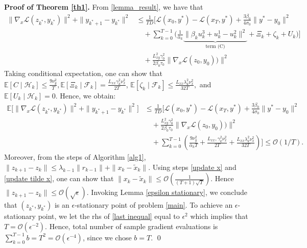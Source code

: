 \documentclass[letterpaper,11 pt]{article}
\def\ml{\mathcal L}
\begin{document}
{\bf Proof of Theorem \ref{th1}.} From \eqref{lemma_result}, we have that
\begin{align}
  \nonumber\|\nabla_x \ml(z_{k^*},y_{k^*})\|^2+\|y_{k^*+1}-y_{k^*}\|^2&\leq \nonumber \tfrac{1}{TD}\biggr[ \ml(x_0,y^*)-\ml(x_T,y^*) +\tfrac{3\beta_0}{4\sigma_0}\|y^*-y_0\|^2\\\nonumber&\quad + \sum_{k=0}^{T-1}\biggr(\tfrac{1}{\bar \alpha_k} \underbrace{\|\beta_k u_k^3+u_k^1-u_k^2\|^2}_{\text{term (C)}}+\Xi_k+\zeta_k+U_k\biggr)\biggr]  \nonumber \\
  &\quad + \tfrac{{L^2_{xy}}\gamma_0^2}{2\beta_0\tau_0}\|\nabla_x \ml(z_0,y_0))\|^2
\end{align}
{ Taking conditional expectation, one can show that $\mathbb E[C \mid \mathcal H_k ]\leq \tfrac{9\nu^2_y}{T}, \mathbb E[\Xi_k \mid \mathcal F_k]=\tfrac{L_{xx} \gamma^2_k \nu^2_x}{2T}$, $\mathbb E[\zeta_k \mid \mathcal F_k]\leq \tfrac{L_{xx} \lambda^2_k \nu^2_x}{32T},$ and $\mathbb E[U_k \mid \mathcal H_k ]=0$. Hence, we obtain:
\begin{align}\label{last inequal}
    \nonumber\mathbb E \biggr[ \|\nabla_x \ml(z_{k^*},y_{k^*})\|^2+\|y_{k^*+1}-y_{k^*}
    \|^2\biggr]&\leq 
  \tfrac{1}{TD} \biggr[ \ml(x_0,y^*)-\ml(x_T,y^*) +\tfrac{3\beta_0}{4\sigma_0}\|y^*-y_0\|^2 \nonumber \\
  & \quad + \tfrac{{L^2_{xy}}\gamma_0^2}{2\beta_0\tau_0}\|\nabla_x \ml(z_0,y_0))\|^2 \nonumber \\&\quad +\sum_{k=0}^{T-1}\left( \tfrac{9\nu^2_y}{\bar \alpha_k T}+\tfrac{L_{xx}, \gamma^2_k \nu^2_x}{2T}+\tfrac{L_{xx} \lambda^2_k \nu^2_x}{32T}\right)\biggr]\leq \mathcal O(1/T).
\end{align}
Moreover, from the steps of Algorithm \ref{alg1}, $\|z_{k+1}-z_k\|\leq \lambda_{k-1}\|r_{k-1}\|+\|x_k-\tilde x_k\|$. Using steps \ref{update x} and \ref{update tilde x}, one can show that $\|x_k-\tilde x_k\|\leq \mathcal O(\tfrac{1}{(T+1)\sqrt T})$. Hence $\|z_{k+1}-z_k\|\leq \mathcal O(\sqrt\epsilon)$. Invoking Lemma \ref{epsilon stationary}, we conclude that $(z_{k^*},y_{k^*})$ is an $\epsilon$-stationary point of problem \eqref{main}.} 
To achieve an $\epsilon$-stationary point, we let the rhs of \eqref{last inequal} equal to $\epsilon^2$ which implies that $T=\mathcal O(\epsilon^{-2})$. Hence, total number of sample gradient evaluations is $\sum_{k=0}^{T-1}b=T^2=\mathcal O(\epsilon^{-4})$, since we chose $b=T$.   \qed


\end{document}
